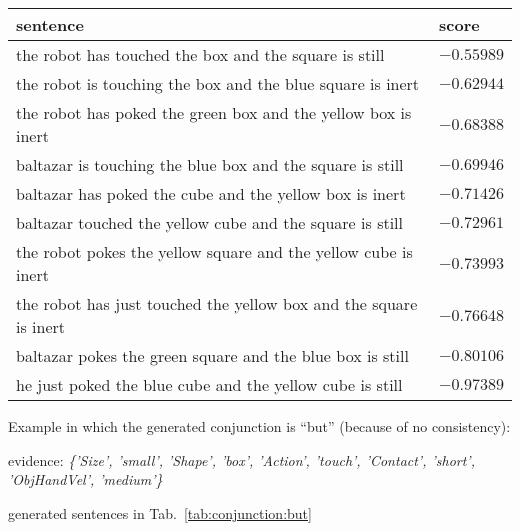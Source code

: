 \begin{table*}
    \centering
    \caption{.}
    \label{tab:conjunction:and}
    \begin{tabular}{ll}
    \toprule
    sentence & score \\
    \midrule
    the robot has touched the box and the square is still & $-0.55989$ \\
    the robot is touching the box and the blue square is inert & $-0.62944$ \\
    the robot has poked the green box and the yellow box is inert & $-0.68388$ \\
    baltazar is touching the blue box and the square is still & $-0.69946$ \\
    baltazar has poked the cube and the yellow box is inert & $-0.71426$ \\
    baltazar touched the yellow cube and the square is still & $-0.72961$ \\
    the robot pokes the yellow square and the yellow cube is inert & $-0.73993$ \\
    the robot has just touched the yellow box and the square is inert & $-0.76648$ \\
    baltazar pokes the green square and the blue box is still & $-0.80106$ \\
    he just poked the blue cube and the yellow cube is still & $-0.97389$ \\
    \bottomrule
    \end{tabular}
\end{table*}

Example in which the generated conjunction is ``but'' (because of no consistency):

evidence: \emph{\{'Size', 'small', 'Shape', 'box', 'Action', 'touch', 'Contact', 'short', 'ObjHandVel', 'medium'\}}

generated sentences in Tab.~\ref{tab:conjunction:but}

